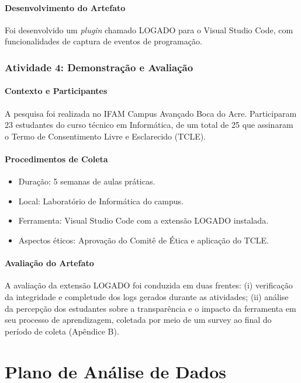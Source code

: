 \paragraph{Desenvolvimento do Artefato}
Foi desenvolvido um \textit{plugin} chamado LOGADO para o Visual Studio Code, com funcionalidades de captura de eventos de programação.

\subsubsection{Atividade 4: Demonstração e Avaliação}

\paragraph{Contexto e Participantes}
A pesquisa foi realizada no IFAM Campus Avançado Boca do Acre. Participaram 23 estudantes do curso técnico em Informática, de um total de 25 que assinaram o Termo de Consentimento Livre e Esclarecido (TCLE).

\paragraph{Procedimentos de Coleta}
\begin{itemize}
    \item Duração: 5 semanas de aulas práticas.
    \item Local: Laboratório de Informática do campus.
    \item Ferramenta: Visual Studio Code com a extensão LOGADO instalada.
    \item Aspectos éticos: Aprovação do Comitê de Ética e aplicação do TCLE.
\end{itemize}

\paragraph{Avaliação do Artefato}
A avaliação da extensão LOGADO foi conduzida em duas frentes: (i) verificação da integridade e completude dos logs gerados durante as atividades; (ii) análise da percepção dos estudantes sobre a transparência e o impacto da ferramenta em seu processo de aprendizagem, coletada por meio de um survey ao final do período de coleta (Apêndice B).

\section{Plano de Análise de Dados}
\label{sec:analise-dados}

